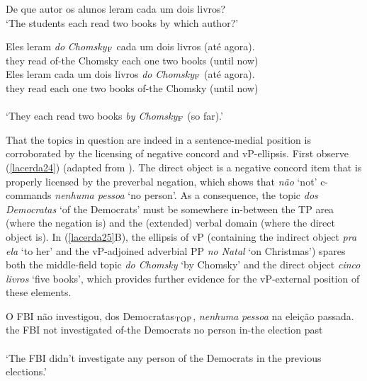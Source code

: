 \documentclass[output=paper]{langscibook}
\begin{document}
\begin{exe}
\ex \label{lacerda23}
\begin{xlist}
 \label{lacerda23A}
De que autor os alunos leram cada um dois livros?\\
‘The students each read two books by which author?’

 \label{lacerda23B1}
\gll *Eles 	leram 	\emph{do} 	\emph{Chomsky}$_{\textnormal{F}}$ 	cada 	um 	dois 	livros 	(até 	agora).\\
they 	read 	of-the 	Chomsky 	each 	one 	two 	books 	(until 	now)\\

 \label{lacerda23B2}
\gll Eles 	leram 	cada 	um 	dois 	livros 	\emph{do} 	\emph{Chomsky}$_{\textnormal{F}}$ 	(até 	agora).\\
they 	read 	each 	one 	two 	books 	of-the 	Chomsky 	(until 	now)\\\\
‘They each read two books \emph{by Chomsky$_{\textnormal{F}}$} (so far).’
\end{xlist}

\end{exe}

That the topics in question are indeed in a sentence-medial position is corroborated by the licensing of negative concord and vP-ellipsis. First observe (\ref{lacerda24}) (adapted from \citealt[258]{Lacerda2016b}). The direct object is a negative concord item that is properly licensed by the preverbal negation, which shows that \emph{não} ‘not’ c-commands \emph{nenhuma pessoa} ‘no person’. As a consequence, the topic \emph{dos Democratas} ‘of the Democrats’ must be somewhere in-between the TP area (where the negation is) and the (extended) verbal domain (where the direct object is). In (\ref{lacerda25}B), the ellipsis of vP (containing the indirect object \emph{pra ela} ‘to her’ and the vP-adjoined adverbial PP \emph{no Natal} ‘on Christmas’) spares both the middle-field topic \emph{do Chomsky} ‘by Chomsky’ and the direct object \emph{cinco livros} ‘five books’, which provides further evidence for the vP-external position of these elements. 

\begin{exe}
\ex \label{lacerda24}
\gll O 	FBI 	não 	investigou, 	dos 	Democratas$_{\textnormal{TOP}}$, 	\emph{nenhuma} 	\emph{pessoa}	na 	eleição 	passada.\\
the 	FBI 	not 	investigated 	of-the 	Democrats 	no 	person	in-the	election	past\\\\
‘The FBI didn’t investigate any person of the Democrats in the previous elections.’\\
\end{exe}
\end{document}

